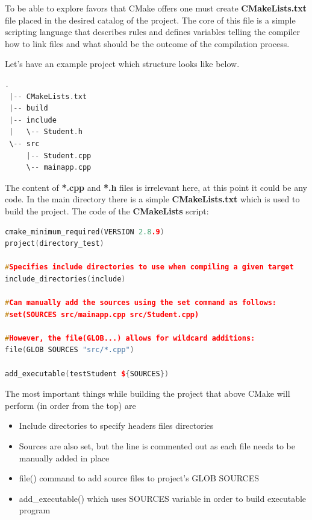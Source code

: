 \documentclass[a4paper,12pt]{book}
\begin{document}
{{\bigskip
To be able to explore favors that CMake offers one must create \textbf{CMakeLists.txt} file placed in the desired catalog of the project. The core of this file is a simple scripting language that describes rules and defines variables telling the compiler how to link files and what should be the outcome of the compilation process.

\bigskip
Let's have an example project\cite{cmakeintroduction} which structure looks like below.\newline
\begin{lstlisting}[frame=single, language=C++, caption={Example CMake project structure.}, captionpos=b]
 .
 |-- CMakeLists.txt
 |-- build
 |-- include
 |   \-- Student.h
 \-- src
     |-- Student.cpp
     \-- mainapp.cpp
\end{lstlisting}

\bigskip
The content of \textbf{*.cpp} and \textbf{*.h} files is irrelevant here, at this point it could be any code. In the main directory there is a simple \textbf{CMakeLists.txt} which is used to build the project. The code of the \textbf{CMakeLists} script:\newline

\begin{lstlisting}[frame=single, language=C++, caption={CMakeLists.txt of example project.}, captionpos=b]
cmake_minimum_required(VERSION 2.8.9)
project(directory_test)

#Specifies include directories to use when compiling a given target
include_directories(include)

#Can manually add the sources using the set command as follows:
#set(SOURCES src/mainapp.cpp src/Student.cpp)

#However, the file(GLOB...) allows for wildcard additions:
file(GLOB SOURCES "src/*.cpp")

add_executable(testStudent ${SOURCES})
\end{lstlisting}
\bigskip
The most important things while building the project that above CMake will perform (in order from the top) are
\begin{itemize}
	\item Include directories to specify headers files directories
	\item Sources are also set, but the line is commented out as each file needs to be manually added in place
	\item file() command to add source files to project's GLOB SOURCES
	\item add\_executable() which uses SOURCES variable in order to build executable program
\end{itemize}


}}
\end{document}
